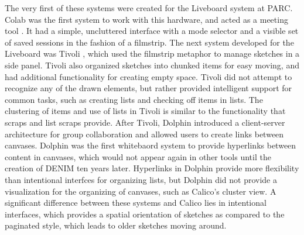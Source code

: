The very first of these systems were created for the Liveboard system at PARC. Colab was the first system to work with this hardware, and acted as a meeting tool \citep{Stefik}. It had a simple, uncluttered interface with a mode selector and a visible set of saved sessions in the fashion of a filmstrip. The next system developed for the Liveboard was Tivoli \citep{Pederson}, which used the filmstrip metaphor to manage sketches in a side panel. Tivoli also organized sketches into chunked items for easy moving, and had additional functionality for creating empty space. Tivoli did not attempt to recognize any of the drawn elements, but rather provided intelligent support for common tasks, such as creating lists and checking off items in lists. The clustering of items and use of lists in Tivoli is similar to the functionality that scraps and list scraps provide. After Tivoli, Dolphin \citep{Streitz:1994:DIM:192844.193044} introduced a client-server architecture for group collaboration and allowed users to create links between canvases. Dolphin was the first whitebaord system to provide hyperlinks between content in canvases, which would not appear again in other tools until the creation of DENIM ten years later. Hyperlinks in Dolphin provide more flexibility than intentional interfces for organizing lists, but Dolphin did not provide a visualization for the organizing of canvases, such as Calico's cluster view. A significant difference between these systems and Calico lies in intentional interfaces, which provides a spatial orientation of sketches as compared to the paginated style, which leads to older sketches moving around. 

